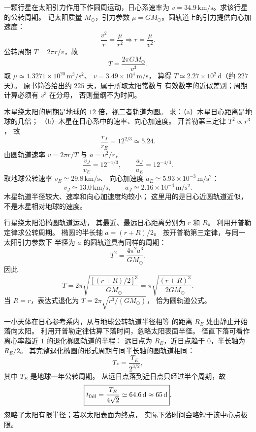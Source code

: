 一颗行星在太阳引力作用下作圆周运动，日心系速率为
$v=34.9\,\mathrm{km/s}$。求该行星的公转周期。
\exsolution
记太阳质量 $M_\odot$，引力参数
$\mu=GM_\odot$。圆轨道上的引力提供向心加速度：
\[
\frac{v^2}{r}=\frac{\mu}{r^2}
\Longrightarrow r=\frac{\mu}{v^2}.
\]
公转周期 $T=2\pi r/v$，故
\[
\boxed{T=\frac{2\pi GM_\odot}{v^3}}.
\]
取 $\mu\simeq1.3271\times10^{20}\,\mathrm{m^3/s^2}$、
$v=3.49\times10^4\,\mathrm{m/s}$，
算得 $T\simeq2.27\times10^2\,\mathrm d$（约 $227$ 天）。
\excheck 原书简答给出约 $225$ 天，属于所取太阳常数与
有效数字的近似差别；周期计算必须有 $v^3$ 在分母，
否则量纲不为时间。

木星绕太阳的周期是地球的 $12$ 倍，视二者轨道为圆。
求：（a）木星日心距离是地球的几倍；
（b）木星在日心系中的速率、向心加速度。
\exsolution
开普勒第三定律 $T^2\propto r^3$，
故
\[
\boxed{\frac{r_J}{r_E}=12^{2/3}\simeq5.24}.
\]
由圆轨道速率 $v=2\pi r/T$ 与
$a=v^2/r$，
\[
\frac{v_J}{v_E}=12^{-1/3},\qquad
\frac{a_J}{a_E}=12^{-4/3}.
\]
取地球公转速率 $v_E\simeq29.8\,\mathrm{km/s}$、
向心加速度 $a_E\simeq5.93\times10^{-3}\,\mathrm{m/s^2}$：
\[
\boxed{v_J\simeq13.0\,\mathrm{km/s},\qquad
a_J\simeq2.16\times10^{-4}\,\mathrm{m/s^2}}.
\]
\excheck 木星轨道半径较大、速率和向心加速度均较小；
这里用的是日心近圆轨道近似，不是木星相对地球的速度。

行星绕太阳沿椭圆轨道运动，
其最近、最远日心距离分别为 $r$ 和 $R$。
利用开普勒定律求公转周期。
\exsolution
椭圆的半长轴
$a=(r+R)/2$。
按开普勒第三定律，与同一太阳引力参数下
半径为 $a$ 的圆轨道具有同样的周期：
\[
T^2=\frac{4\pi^2a^3}{GM_\odot}.
\]
因此
\[
\boxed{T=2\pi\sqrt{\frac{[(r+R)/2]^3}{GM_\odot}}
=\pi\sqrt{\frac{(r+R)^3}{2GM_\odot}}}.
\]
\excheck 当 $R=r$，表达式退化为
$T=2\pi\sqrt{r^3/(GM_\odot)}$，
恰为圆轨道公式。

一小天体在日心参考系内，从与地球公转轨道半径相等
的距离 $R_E$ 处由静止开始落向太阳。
利用开普勒定律估算下落时间，忽略太阳表面半径。
\exsolution
径直下落可看作离心率趋近 $1$ 的退化椭圆轨道的半程：
远日点为 $R_E$，近日点趋于 $0$，半长轴为 $R_E/2$。
其完整退化椭圆的形式周期与同半长轴的圆轨道相同：
\[
T_*=\frac{T_E}{2^{3/2}},
\]
其中 $T_E$ 是地球一年公转周期。
从远日点落到近日点只经过半个周期，故
\[
\boxed{t_{\rm fall}=\frac{T_E}{4\sqrt2}
\simeq64.6\,\mathrm d\approx65\,\mathrm d}.
\]
\excheck 忽略了太阳有限半径；若以太阳表面为终点，
实际下落时间会略短于该中心点极限。

